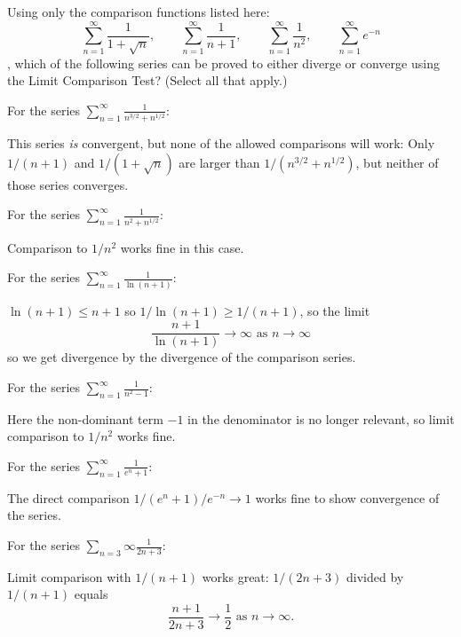 \documentclass{ximera}
\begin{document}
\begin{exercise}
Using only the comparison functions listed here:
\[ \sum_{n=1}^\infty \frac{1}{1+\sqrt{n}}, \qquad \sum_{n=1}^\infty \frac{1}{n+1},  \qquad \sum_{n=1}^\infty \frac{1}{n^2}, \qquad \sum_{n=1}^\infty e^{-n} \]
, which of the following series can be proved to either diverge or converge using the Limit Comparison Test? (Select all that apply.)
\begin{selectAll}
\end{selectAll}
\begin{feedback}
For the series {$\displaystyle \sum_{n=1}^\infty \frac{1}{n^{3/2}+n^{1/2}}$}:
\begin{expandable}
This series \textit{is} convergent, but none of the allowed comparisons will work: Only $1/(n+1)$ and $1/(1+\sqrt{n})$ are larger than $1/(n^{3/2}+n^{1/2})$, but neither of those series converges.
\end{expandable}

For the series {$\displaystyle \sum_{n=1}^\infty \frac{1}{n^2 + n^{1/2}}$}:
\begin{expandable}
Comparison to $1/n^2$ works fine in this case.
\end{expandable}

For the series {$\displaystyle \sum_{n=1}^\infty \frac{1}{\ln (n+1)}$}:
\begin{expandable}
$\ln (n+1) \leq n+1$ so $1/\ln (n+1) \geq 1/(n+1)$, so the limit
\[ \frac{n+1}{\ln (n+1)} \rightarrow \infty \text{ as } n \rightarrow \infty \]
so we get divergence by the divergence of the comparison series.
\end{expandable}

For the series {$\displaystyle \sum_{n=1}^\infty \frac{1}{n^2-1}$}:
\begin{expandable}
Here the non-dominant term $-1$ in the denominator is no longer relevant, so limit comparison to $1/n^2$ works fine.
\end{expandable}

For the series {$\displaystyle \sum_{n=1}^\infty \frac{1}{e^n  + 1}$}:
\begin{expandable}
The direct comparison $1/(e^n + 1) / e^{-n} \rightarrow 1$ works fine to show convergence of the series.
\end{expandable}

For the series {$\displaystyle \sum_{n=3}{\infty} \frac{1}{2n+3}$}:
\begin{expandable}
Limit comparison with $1/(n+1)$ works great: $1/(2n+3)$ divided by $1/(n+1)$ equals
\[ \frac{n+1}{2n+3} \rightarrow \frac{1}{2} \text{ as } n \rightarrow \infty. \]
\end{expandable}

\end{feedback}
\end{exercise}
\end{document}
